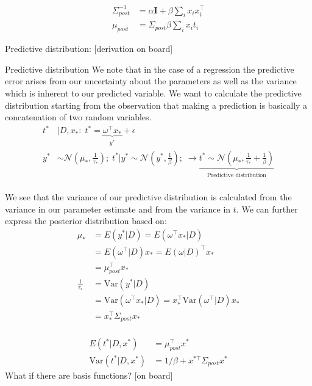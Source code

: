 \begin{align}
\Sigma_{post}^{-1}&=\alpha \mathbf{I}+\beta \sum_i x_i x_i^\top\\
\mu_{post}&=\Sigma_{post} \beta \sum_i x_i t_i
\end{align}

Predictive distribution: [derivation on board]

\begin{bbbox}{Predictive distribution}
	We note that in the case of a regression the predictive error arises from our uncertainty about the parameters as well as the variance which is inherent to our predicted variable. We want to calculate the predictive distribution starting from the observation that making a prediction is basically a concatenation of two random variables.
	\begin{align*}
		t^* &| D, x_*: \;
		t^* = \underbrace{\omega^{\top}x_*}_{y^*} + \epsilon \\		
		y^* &\sim \mathcal{N} (\mu_*,\frac{1}{\tau_{*}}); \;
		t^*|y^* \sim \mathcal{N}(y^*,\frac{1}{\beta}); \;
		\rightarrow \underbrace{t^* \sim \mathcal{N}(\mu_*,\frac{1}{\tau_{*}} + \frac{1}{\beta})}_{\text{Predictive distribution}} \\
	\end{align*}
	
We see that the variance of our predictive distribution is calculated from the variance in our parameter estimate and from the variance in $t$. We can further express the posterior distribution based on:
	\begin{align*}
		\mu_* &= E(y^* | D) = E(\omega^{\top} x_* | D) \\
		      &= E(\omega^{\top} | D) x_* = E(\omega | D)^{\top} x_* \\
		      &= \mu_{post}^{\top} x_* \\
		\frac{1}{\tau_{*}} &= \mbox{Var}(y^* | D) \\
		     &= \mbox{Var}(\omega^{\top} x_* | D) = x_*^{\top} \mbox{Var}(\omega^{\top} | D) x_* \\
   		     &= x_*^{\top} \Sigma_{post} x_* \\
	\end{align*}
\end{bbbox}

\begin{align}
E(t^*|D,x^*)&= \mu_{post}^\top x^* \\
\mbox{Var}(t^*|D,x^*)&=  1/\beta+ x^{*\top} \Sigma_{post} x^*
\end{align}
What if there are basis functions? [on board]



